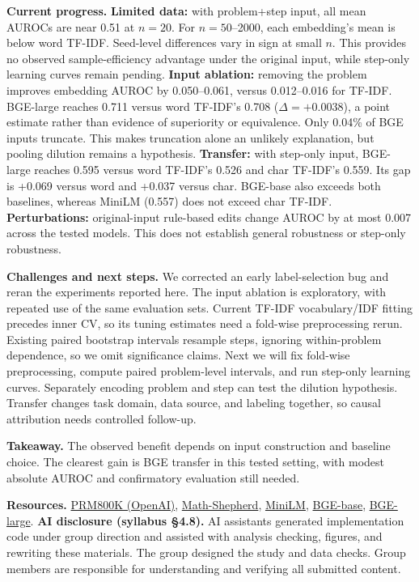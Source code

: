 \documentclass[10pt]{article}
\newcommand{\head}[1]{\vspace{3pt}\textbf{#1}\quad}
\begin{document}
\head{Current progress.}
\textbf{Limited data:} with problem+step input, all mean AUROCs are near 0.51 at $n=20$.
For $n=50$--2000, each embedding's mean is below word TF-IDF. Seed-level differences vary in sign at small $n$.
This provides no observed sample-efficiency advantage under the original input, while step-only learning curves remain pending.
\textbf{Input ablation:} removing the problem improves embedding AUROC by 0.050--0.061, versus 0.012--0.016 for TF-IDF.
BGE-large reaches 0.711 versus word TF-IDF's 0.708 ($\Delta=+0.0038$), a point estimate rather than evidence of superiority or equivalence.
Only 0.04\% of BGE inputs truncate. This makes truncation alone an unlikely explanation, but pooling dilution remains a hypothesis.
\textbf{Transfer:} with step-only input, BGE-large reaches 0.595 versus word TF-IDF's 0.526 and char TF-IDF's 0.559.
Its gap is +0.069 versus word and +0.037 versus char. BGE-base also exceeds both baselines, whereas MiniLM (0.557) does not exceed char TF-IDF.
\textbf{Perturbations:} original-input rule-based edits change AUROC by at most 0.007 across the tested models. This does not establish general robustness or step-only robustness.

\head{Challenges and next steps.}
We corrected an early label-selection bug and reran the experiments reported here.
The input ablation is exploratory, with repeated use of the same evaluation sets.
Current TF-IDF vocabulary/IDF fitting precedes inner CV, so its tuning estimates need a fold-wise preprocessing rerun.
Existing paired bootstrap intervals resample steps, ignoring within-problem dependence, so we omit significance claims.
Next we will fix fold-wise preprocessing, compute paired problem-level intervals, and run step-only learning curves.
Separately encoding problem and step can test the dilution hypothesis.
Transfer changes task domain, data source, and labeling together, so causal attribution needs controlled follow-up.

\head{Takeaway.}
The observed benefit depends on input construction and baseline choice.
The clearest gain is BGE transfer in this tested setting, with modest absolute AUROC and confirmatory evaluation still needed.

\vspace{3pt}
{\footnotesize\textbf{Resources.}
\href{https://github.com/openai/prm800k}{PRM800K (OpenAI)},
\href{https://huggingface.co/datasets/peiyi9979/Math-Shepherd}{Math-Shepherd},
\href{https://huggingface.co/sentence-transformers/all-MiniLM-L6-v2}{MiniLM},
\href{https://huggingface.co/BAAI/bge-base-en-v1.5}{BGE-base},
\href{https://huggingface.co/BAAI/bge-large-en-v1.5}{BGE-large}.
\textbf{AI disclosure (syllabus \S4.8).}
AI assistants generated implementation code under group direction and assisted with analysis checking, figures, and rewriting these materials.
The group designed the study and data checks. Group members are responsible for understanding and verifying all submitted content.}
\end{document}
